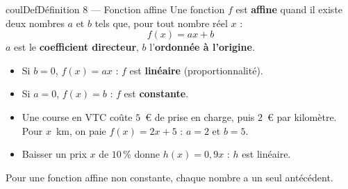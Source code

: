\documentclass[11pt,a4paper]{article}
\makeatletter
\newcounter{lycee@signet}
\newcommand{\signet}[3][]{\stepcounter{lycee@signet}%
  \edef\lycee@dest{\if\relax\detokenize{#1}\relax
    signet.\arabic{lycee@signet}\else#1\fi}%
  \hypertarget{\lycee@dest}{}\bookmark[level=#2,dest=\lycee@dest]{#3}}
\newenvironment{definitionbox}[1][Définition]%
  {\begin{boitecours}[phantom={\signet{2}{#1}}]{coulDef}{#1}}{\end{boitecours}}
\makeatother
\begin{document}
\begin{definitionbox}[Définition 8 --- Fonction affine]
Une fonction $f$ est \textbf{affine} quand il existe deux nombres $a$ et $b$ tels que,
pour tout nombre réel $x$ :
\[
  \boxed{f(x)=ax+b}
\]
$a$ est le \textbf{coefficient directeur}, $b$ l'\textbf{ordonnée à l'origine}.
\begin{itemize}
  \item Si $b=0$, $f(x)=ax$ : $f$ est \textbf{linéaire} (proportionnalité).
  \item Si $a=0$, $f(x)=b$ : $f$ est \textbf{constante}.
\end{itemize}
\end{definitionbox}

\begin{exemplebox}[Exemples]
\begin{itemize}
  \item Une course en VTC coûte $5$~€ de prise en charge, puis $2$~€ par kilomètre.
        Pour $x$~km, on paie $f(x)=2x+5$ : $a=2$ et $b=5$.
  \item Baisser un prix $x$ de $10\,\%$ donne $h(x)=0{,}9x$ : $h$ est linéaire.
\end{itemize}
\end{exemplebox}

\begin{remarquebox}
Pour une fonction affine non constante, chaque nombre a un seul antécédent.
\end{remarquebox}
\end{document}
